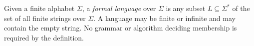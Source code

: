 
Given a finite alphabet $\Sigma$, a \emph{formal language} over $\Sigma$ is any subset $L\subseteq\Sigma^*$ of the set of all finite strings over $\Sigma$. A language may be finite or infinite and may contain the empty string. No grammar or algorithm deciding membership is required by the definition.
